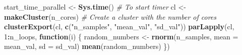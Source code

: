 \documentclass[
]{article}
\newenvironment{Shaded}{\begin{snugshade}}{\end{snugshade}}
\newcommand{\AttributeTok}[1]{\textcolor[rgb]{0.13,0.29,0.53}{#1}}
\newcommand{\CommentTok}[1]{\textcolor[rgb]{0.56,0.35,0.01}{\textit{#1}}}
\newcommand{\ControlFlowTok}[1]{\textcolor[rgb]{0.13,0.29,0.53}{\textbf{#1}}}
\newcommand{\DecValTok}[1]{\textcolor[rgb]{0.00,0.00,0.81}{#1}}
\newcommand{\FunctionTok}[1]{\textcolor[rgb]{0.13,0.29,0.53}{\textbf{#1}}}
\newcommand{\NormalTok}[1]{#1}
\newcommand{\OtherTok}[1]{\textcolor[rgb]{0.56,0.35,0.01}{#1}}
\newcommand{\SpecialCharTok}[1]{\textcolor[rgb]{0.81,0.36,0.00}{\textbf{#1}}}
\newcommand{\StringTok}[1]{\textcolor[rgb]{0.31,0.60,0.02}{#1}}
\begin{document}
\begin{Shaded}
\begin{Highlighting}[]
\NormalTok{start\_time\_parallel }\OtherTok{\textless{}{-}} \FunctionTok{Sys.time}\NormalTok{()  }\CommentTok{\# To start timer}
\NormalTok{cl }\OtherTok{\textless{}{-}} \FunctionTok{makeCluster}\NormalTok{(n\_cores)  }\CommentTok{\# Create a cluster with the number of cores}
\FunctionTok{clusterExport}\NormalTok{(cl, }\FunctionTok{c}\NormalTok{(}\StringTok{"n\_samples"}\NormalTok{, }\StringTok{"mean\_val"}\NormalTok{, }\StringTok{"sd\_val"}\NormalTok{))}
\FunctionTok{parLapply}\NormalTok{(cl, }\DecValTok{1}\SpecialCharTok{:}\NormalTok{n\_loops, }\ControlFlowTok{function}\NormalTok{(i) \{}
\NormalTok{  random\_numbers }\OtherTok{\textless{}{-}} \FunctionTok{rnorm}\NormalTok{(n\_samples, }\AttributeTok{mean =}\NormalTok{ mean\_val, }\AttributeTok{sd =}\NormalTok{ sd\_val)}
  \FunctionTok{mean}\NormalTok{(random\_numbers)}
\NormalTok{\})}
\end{Highlighting}
\end{Shaded}
\end{document}
